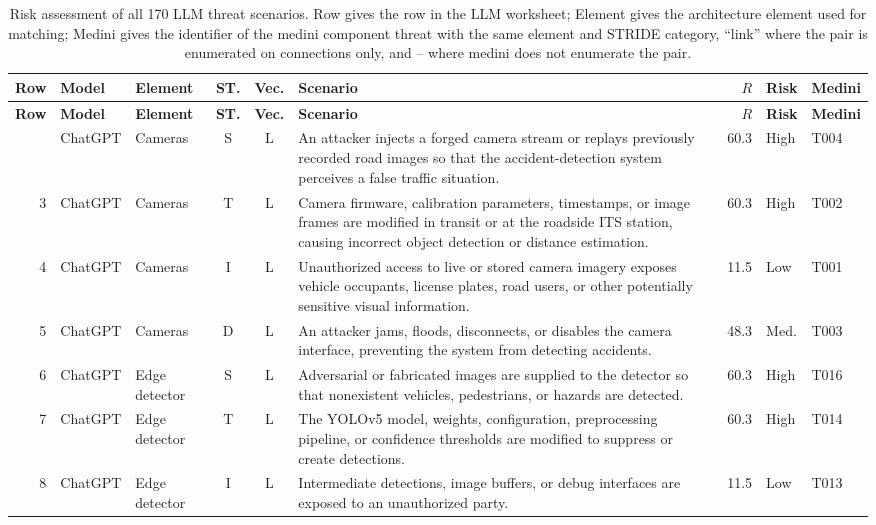 \documentclass[9pt]{extarticle}
\begin{document}
\clearpage
\begin{longtable}{r l >{\raggedright\arraybackslash}p{2.6cm} c c >{\raggedright\arraybackslash}p{8.1cm} r l l}
\caption{Risk assessment of all 170 LLM threat scenarios. Row gives the row in
the LLM worksheet; Element gives the architecture element used for matching;
Medini gives the identifier of the medini component threat with the same
element and STRIDE category, ``link'' where the pair is enumerated on
connections only, and -- where medini does not enumerate the pair.}\label{tab:s2}\\
\toprule
\textbf{Row} & \textbf{Model} & \textbf{Element} & \textbf{ST.} & \textbf{Vec.} & \textbf{Scenario} & $R$ & \textbf{Risk} & \textbf{Medini} \\
\midrule
\endfirsthead
\toprule
\textbf{Row} & \textbf{Model} & \textbf{Element} & \textbf{ST.} & \textbf{Vec.} & \textbf{Scenario} & $R$ & \textbf{Risk} & \textbf{Medini} \\
\midrule
\endhead
\bottomrule
\endfoot
2 & ChatGPT & Cameras & S & L & An attacker injects a forged camera stream or replays previously recorded road images so that the accident-detection system perceives a false traffic situation. & 60.3 & High & T004 \\
3 & ChatGPT & Cameras & T & L & Camera firmware, calibration parameters, timestamps, or image frames are modified in transit or at the roadside ITS station, causing incorrect object detection or distance estimation. & 60.3 & High & T002 \\
4 & ChatGPT & Cameras & I & L & Unauthorized access to live or stored camera imagery exposes vehicle occupants, license plates, road users, or other potentially sensitive visual information. & 11.5 & Low & T001 \\
5 & ChatGPT & Cameras & D & L & An attacker jams, floods, disconnects, or disables the camera interface, preventing the system from detecting accidents. & 48.3 & Med. & T003 \\
6 & ChatGPT & Edge detector & S & L & Adversarial or fabricated images are supplied to the detector so that nonexistent vehicles, pedestrians, or hazards are detected. & 60.3 & High & T016 \\
7 & ChatGPT & Edge detector & T & L & The YOLOv5 model, weights, configuration, preprocessing pipeline, or confidence thresholds are modified to suppress or create detections. & 60.3 & High & T014 \\
8 & ChatGPT & Edge detector & I & L & Intermediate detections, image buffers, or debug interfaces are exposed to an unauthorized party. & 11.5 & Low & T013 \\

\end{longtable}
\end{document}
